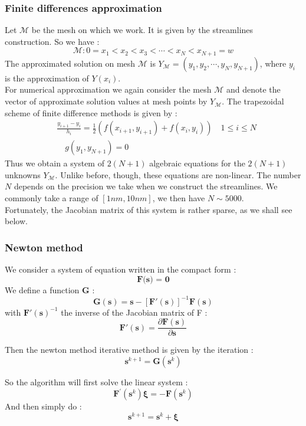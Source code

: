 \documentclass[10pt,a4paper,twocolumn]{article}
\begin{document}
\subsubsection{Finite differences approximation}
Let $\mathcal{M}$ be the mesh on which we work. It is given by the streamlines construction. So we have : 
\[\mathcal{M}: 0 = x_1 < x_2 < x_3 < \cdots < x_N < x_{N+1} = w \]
The approximated solution on mesh $\mathcal{M}$ is $Y_{\mathcal{M}} = (y_1, y_2, \cdots, y_N, y_{N+1})$, where $y_i$ is the approximation of $Y(x_i)$.\\
For numerical approximation we again consider the mesh $\mathcal{M}$ and denote the vector of approximate solution values at mesh points by $Y_{\mathcal{M}}$. The trapezoidal scheme of finite difference methods is given by : 
\begin{align}\label{TrapezScheme}
&\frac{y_{i+1}-y_{i}}{h_{i}}=\frac{1}{2}\left(f\left(x_{i+1}, y_{i+1}\right)+f\left(x_{i}, y_{i}\right)\right) \quad 1 \leq i \leq N \\
&\quad g\left(y_{1}, y_{N+1}\right)=0
\end{align}
Thus we obtain a system of $2(N +1)$ algebraic equations for the $2(N +1)$ unknowns $Y_{\mathcal{M}}$. Unlike before, though, these equations are non-linear. The number $N$ depends on the precision we take when we construct the streamlines. We commonly take a range of $\left[1nm, 10nm\right]$, we then have $N \sim 5000$. \\
Fortunately, the Jacobian matrix of this system is rather sparse, as we shall see below.

\subsubsection{Newton method}
We consider a system of equation written in the compact form : \[ \textbf{F(s) = 0} \]
We define a function \textbf{G} : 
\[  \textbf{G}(\textbf{s}) = \textbf{s} - \left[\textbf{F}'(\textbf{s}) \right]^{-1} \textbf{F}(\textbf{s})\]
with $\textbf{F}'(\textbf{s})^{-1} $ the inverse of the Jacobian matrix of F : 
\[\textbf{F}'(\textbf{s}) = \frac{\partial\textbf{F}(\textbf{s}) }{\partial \textbf{s}}  \]

Then the newton method iterative method is given by the iteration : 
\[\textbf{s}^{k+1} =  \textbf{G}(\textbf{s}^k) \]

So the algorithm will first solve the linear system : 
\begin{equation}
\mathbf{F}^{\prime}\left(\mathbf{s}^{k}\right) \boldsymbol{\xi}=-\mathbf{F}\left(\mathbf{s}^{k}\right)
\end{equation} 
And then simply do : 
\begin{equation}
\textbf{s}^{k+1} = \textbf{s}^{k} + \boldsymbol{\xi}
\end{equation} 
\end{document}
